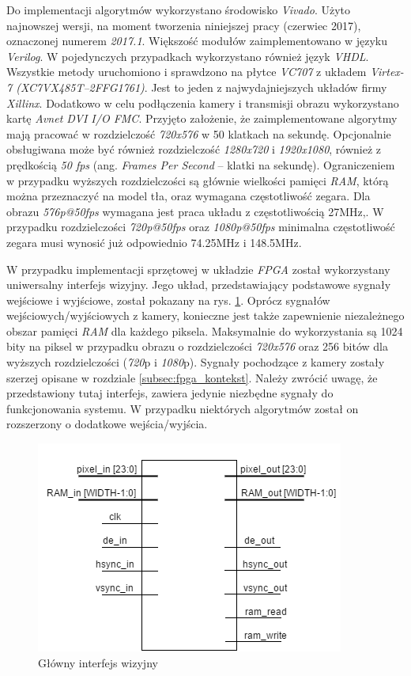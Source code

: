 Do implementacji algorytmów wykorzystano środowisko \textit{Vivado}. Użyto najnowszej wersji, na moment tworzenia niniejszej pracy (czerwiec 2017), oznaczonej numerem \textit{2017.1}. Większość modułów zaimplementowano w języku \textit{Verilog}. W pojedynczych przypadkach wykorzystano również język \textit{VHDL}. Wszystkie metody uruchomiono i sprawdzono na płytce \textit{VC707} z układem \textit{Virtex-7 (\small{XC7VX485T--2FFG1761})}. Jest to jeden z najwydajniejszych układów firmy \textit{Xillinx}. Dodatkowo w celu podłączenia kamery i transmisji obrazu wykorzystano kartę \textit{Avnet DVI I/O FMC}. Przyjęto założenie, że zaimplementowane algorytmy mają pracować w rozdzielczość \textit{720x576} w 50 klatkach na sekundę. Opcjonalnie obsługiwana może być również rozdzielczość \textit{1280x720} i \textit{1920x1080}, również z prędkością \textit{50 fps} (ang. \textit{Frames Per Second} -- klatki na sekundę). Ograniczeniem w przypadku wyższych rozdzielczości są głównie wielkości pamięci \textit{RAM}, którą można przeznaczyć na model tła, oraz wymagana częstotliwość zegara. Dla obrazu \textit{576p@50fps} wymagana jest praca układu z częstotliwością \num{27}MHz,. W przypadku rozdzielczości \textit{720p@50fps} oraz \textit{1080p@50fps} minimalna częstotliwość zegara musi wynosić już odpowiednio \num{74.25}MHz i \num{148.5}MHz.

W przypadku implementacji sprzętowej w układzie \textit{FPGA} został wykorzystany uniwersalny interfejs wizyjny. Jego układ, przedstawiający podstawowe sygnały wejściowe i wyjściowe, został pokazany na rys. \ref{fig:fpga_vision_if}. Oprócz sygnałów wejściowych/wyjściowych z kamery, konieczne jest także zapewnienie niezależnego obszar pamięci \textit{RAM} dla każdego piksela. Maksymalnie do wykorzystania są 1024 bity na piksel w przypadku obrazu o rozdzielczości \textit{720x576} oraz 256 bitów dla wyższych rozdzielczości (\textit{720}p i \textit{1080}p). Sygnały pochodzące z kamery zostały szerzej opisane w rozdziale \ref{subsec:fpga_kontekst}. Należy zwrócić uwagę, że przedstawiony tutaj interfejs, zawiera jedynie niezbędne sygnały do funkcjonowania systemu. W przypadku niektórych algorytmów został on rozszerzony o dodatkowe wejścia/wyjścia. 

	\begin{figure}[h!]
			\centering
			\includegraphics[scale=0.75]{img/4/vision_if.png}
			\caption{Główny interfejs wizyjny}
			\label{fig:fpga_vision_if}
	\end{figure}

